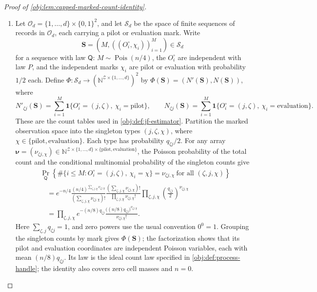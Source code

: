 \begin{proof}[Proof of \cref{obj:lem:capped-marked-count-identity}]
\begin{enumerate}
\item Let \(\mathcal O_d=\{1,\ldots,d\}\times\{0,1\}^2\), and let \(\mathcal S_d\) be the space of finite sequences of records in \(\mathcal O_d\), each carrying a pilot or evaluation mark. Write
\[
\mathbf S=(M,((O_i^\circ,\chi_i))_{i=1}^M)\in\mathcal S_d
\]
for a sequence with law \(\mathsf Q\): \(M\sim\operatorname{Pois}(n/4)\), the \(O_i^\circ\) are independent with law \(P\), and the independent marks \(\chi_i\) are pilot or evaluation with probability \(1/2\) each. Define \(\Phi:\mathcal S_d\to(\mathbb N^{\mathcal Z\times\{1,\ldots,d\}})^2\) by \(\Phi(\mathbf S)=(N'(\mathbf S),N(\mathbf S))\), where
\[
N'_{\zeta j}(\mathbf S)
=\sum_{i=1}^M\mathbf1\{O_i^\circ=(j,\zeta),\ \chi_i=\mathrm{pilot}\},
\qquad
N_{\zeta j}(\mathbf S)
=\sum_{i=1}^M\mathbf1\{O_i^\circ=(j,\zeta),\ \chi_i=\mathrm{evaluation}\}.
\]
These are the count tables used in \cref{obj:def:jf-estimator}. Partition the marked observation space into the singleton types \((j,\zeta,\chi)\), where \(\chi\in\{\mathrm{pilot},\mathrm{evaluation}\}\). Each type has probability \(q_{\zeta j}/2\). For any array \(\boldsymbol\nu=(\nu_{\zeta j,\chi})\in\mathbb N^{\mathcal Z\times\{1,\ldots,d\}\times\{\mathrm{pilot},\mathrm{evaluation}\}}\), the Poisson probability of the total count and the conditional multinomial probability of the singleton counts give
\[
\begin{aligned}
&\Pr_{\mathsf Q}\!\left\{
\#\{i\leq M:O_i^\circ=(j,\zeta),\ \chi_i=\chi\}
=\nu_{\zeta j,\chi}\ \text{for all }(\zeta,j,\chi)\right\}\\
&\quad=e^{-n/4}
\frac{(n/4)^{\sum_{\zeta,j,\chi}\nu_{\zeta j,\chi}}}
{\left(\sum_{\zeta,j,\chi}\nu_{\zeta j,\chi}\right)!}
\frac{\left(\sum_{\zeta,j,\chi}\nu_{\zeta j,\chi}\right)!}
{\prod_{\zeta,j,\chi}\nu_{\zeta j,\chi}!}
\prod_{\zeta,j,\chi}\left(\frac{q_{\zeta j}}2\right)^{\nu_{\zeta j,\chi}}\\
&\quad=\prod_{\zeta,j,\chi}
 e^{-(n/8)q_{\zeta j}}
 \frac{\bigl((n/8)q_{\zeta j}\bigr)^{\nu_{\zeta j,\chi}}}
 {\nu_{\zeta j,\chi}!}.
\end{aligned}
\]
Here \(\sum_{\zeta,j}q_{\zeta j}=1\), and zero powers use the usual convention \(0^0=1\). Grouping the singleton counts by mark gives \(\Phi(\mathbf S)\); the factorization shows that its pilot and evaluation coordinates are independent Poisson variables, each with mean \((n/8)q_{\zeta j}\). Its law is the ideal count law specified in \cref{obj:def:process-handle}; the identity also covers zero cell masses and \(n=0\).


\end{enumerate}
\end{proof}
